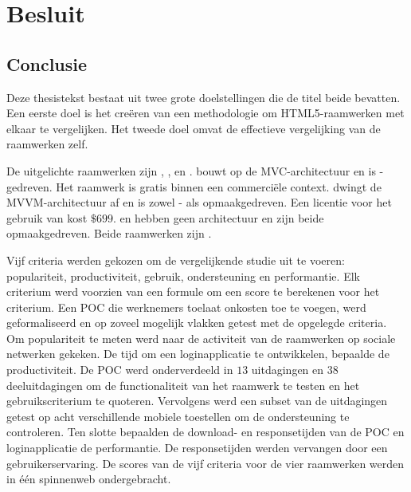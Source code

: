 \chapter{Besluit}
\label{chap:besluit}

\section{Conclusie} %

Deze thesistekst bestaat uit twee grote doelstellingen die de titel beide bevatten.
Een eerste doel is het creëren van een methodologie om HTML5-raamwerken met elkaar te vergelijken.
Het tweede doel omvat de effectieve vergelijking van de raamwerken zelf.

De uitgelichte raamwerken zijn \st{}, \kendo{},  \jqm{} en \lungo{}.
\st{} bouwt op de MVC-architectuur en is \js-gedreven.
Het raamwerk is gratis binnen een commerciële context.
\kendo{} dwingt de MVVM-architectuur af en is zowel \js- als opmaakgedreven.
Een licentie voor het gebruik van \kendo{} kost $\$699$.
\jqm{} en \lungo{} hebben geen architectuur en zijn beide opmaakgedreven.
Beide raamwerken zijn .

Vijf criteria werden gekozen om de vergelijkende studie uit te voeren:  populariteit,  productiviteit,  gebruik,  ondersteuning en performantie.
Elk criterium werd voorzien van een formule om een score te berekenen voor het criterium.
Een POC die werknemers toelaat onkosten toe te voegen, werd geformaliseerd en op zoveel mogelijk vlakken getest met de opgelegde criteria.
Om populariteit te meten werd naar de activiteit van de raamwerken op sociale netwerken gekeken.
De tijd om een loginapplicatie te ontwikkelen, bepaalde de productiviteit.
De POC werd onderverdeeld in $13$ uitdagingen en $38$ deeluitdagingen om de functionaliteit van het raamwerk te testen en het gebruikscriterium te quoteren.
Vervolgens werd een subset van de uitdagingen getest op acht verschillende mobiele toestellen om de ondersteuning te controleren.
Ten slotte bepaalden de download- en responsetijden van de POC en loginapplicatie de performantie.
De responsetijden werden vervangen door een gebruikerservaring.
De scores van de vijf criteria voor de vier raamwerken werden in één spinnenweb ondergebracht.

